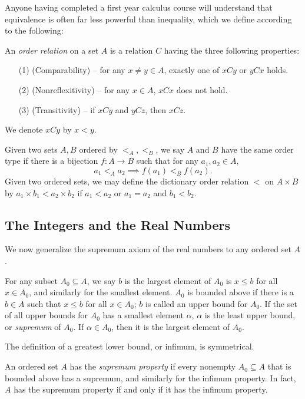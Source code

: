 Anyone having completed a first year calculus course will understand that equivalence is often far less powerful than inequality, which we define according to the following:
\begin{definition}\label{1.4}
    An {\it order relation} on a set $A$ is a relation $C$ having the three following properties:
    \begin{enumerate}
        \item[(1)] (Comparability) -- for any $x \neq y \in A$, exactly one of $xCy$ or $yCx$ holds.
        \item[(2)] (Nonreflexitivity) -- for any $x \in A$, $xCx$ does not hold.
        \item[(3)] (Transitivity) -- if $xCy$ and $yCz$, then $xCz$.
    \end{enumerate} 
    We denote $xCy$ by $x < y$.
\end{definition}
Given two sets $A, B$ ordered by $<_A, <_B$, we say $A$ and $B$ have the same order type if there is a bijection $f : A \rightarrow B$ such that for any $a_1, a_2 \in A,$
$$a_1 <_A a_2 \implies f(a_1) <_B f(a_2).$$
Given two ordered sets, we may define the dictionary order relation $<$ on $A \times B$ by $a_1 \times b_1 < a_2 \times b_2$ if $a_1 < a_2$ or $a_1 = a_2$ and $b_1 < b_2$.

\subsection{The Integers and the Real Numbers}

We now generalize the supremum axiom of the real numbers to any ordered set $A$.

\begin{definition}\label{1.5}
    For any subset $A_0 \subseteq A$, we say $b$ is the largest element of $A_0$ is $x \leq b$ for all $x \in A_0$, and similarly for the smallest element.
    \vspace{10pt}
    $A_0$ is bounded above if there is a $b \in A$ such that $x \leq b$ for all $x \in A_0$; $b$ is called an upper bound for $A_0$. If the set of all upper bounds for $A_0$ has a smallest element $\alpha$, $\alpha$ is the least upper bound, or {\it supremum} of $A_0$. If $\alpha \in A_0$, then it is the largest element of $A_0$.
    \vspace{10pt}

    The definition of a greatest lower bound, or infimum, is symmetrical.
    \vspace{10pt}

    An ordered set $A$ has the {\it supremum property} if every nonempty $A_0 \subseteq A$ that is bounded above has a supremum, and similarly for the infimum property. In fact, $A$ has the supremum property if and only if it has the infimum property.
\end{definition}

